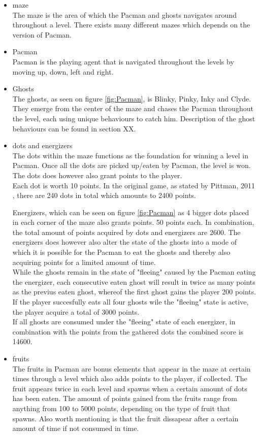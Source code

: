 \begin{itemize}
\item maze\\
The maze is the area of which the Pacman and ghosts navigates around throughout a level. There exists many different mazes which depends on the version of Pacman.
\item Pacman\\
Pacman is the playing agent that is navigated throughout the levels by moving up, down, left and right.
\item Ghosts\\
The ghosts, as seen on figure \ref{fig:Pacman}, is Blinky, Pinky, Inky and Clyde. They emerge from the center of the maze and chases the Pacman throughout the level, each using unique behaviours to catch him. Description of the ghost behaviours can be found in section XX.
\item dots and energizers\\
The dots within the maze functions as the foundation for winning a level in Pacman. Once all the dots are picked up/eaten by Pacman, the level is won.\\
The dots does however also grant points to the player.\\
Each dot is worth 10 points. In the original game, as stated by Pittman, 2011 \cite{Pittman2011}, there are 240 dots in total which amounts to 2400 points.

Energizers, which can be seen on figure \ref{fig:Pacman} as 4 bigger dots placed in each corner of the maze also grants points. 50 points each.
In combination, the total amount of points acquired by dots and energizers are  2600. The energizers does however also alter the state of the ghosts into a mode of which it is possible for the Pacman to eat the ghosts and thereby also acquiring points for a limited amount of time.\\
While the ghosts remain in the state of "fleeing" caused by the Pacman eating the energizer, each consecutive eaten ghost will result in twice as many points as the previus eaten ghost, whereof the first ghost gains the player 200 points.\\
If the player succesfully eats all four ghosts wile the "fleeing" state is active, the player acquire a total of 3000 points.\\

If all ghosts are consumed under the "fleeing" state of each energizer, in combination with the points from the gathered dots the combined score is 14600.
\item fruits\\
The fruits in Pacman are bonus elements that appear in the maze at certain times through a level which also adds points to the player, if collected. The fruit appears twice in each level and spawns when a certain amount of dots has been eaten.
The amount of points gained from the fruits range from anything from 100 to 5000 points, depending on the type of fruit that spawns. Also worth mentioning is that the fruit dissapear after a certain amount of time if not consumed in time.
\end{itemize}


